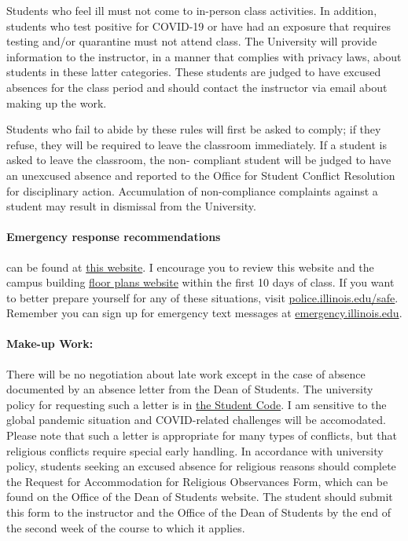 \documentclass[11pt, a4paper]{article}
\begin{document}
                Students who feel ill must not come to in-person class 
                activities. In addition, students who test positive for 
                COVID-19 or have had an exposure that requires testing and/or 
                quarantine must not attend class.  The University will provide 
                information to the instructor, in a manner that complies with 
                privacy laws, about students in these latter categories. These 
                students are judged to have excused absences for the class 
                period and should contact the instructor via email about making 
                up the work.  

                Students who fail to abide by these rules will first be asked 
                to comply; if they refuse, they will be required to leave the 
                classroom immediately. If a student is asked to leave the 
                classroom, the non- compliant student will be judged to have an 
                unexcused absence and reported to the Office for Student 
                Conflict Resolution for disciplinary action. Accumulation of 
                non-compliance complaints against a student may result in 
                dismissal from the University.  

\paragraph{Emergency response recommendations} can be found at 
        \href{http://police.illinois.edu/emergency-preparedness/}{this website}. 
        I encourage you to review this website and the campus building 
        \href{http://police.illinois.edu/emergency-preparedness/building-emergency-action-plans/}{floor 
        plans website} within the first 10 days of class.  If you want to 
        better prepare yourself for any of these situations, visit 
        \url{police.illinois.edu/safe}. Remember you can sign up for emergency 
        text messages at \url{emergency.illinois.edu}.
\paragraph{Make-up Work:} There will be no negotiation about late work 
        except in the case of absence documented by an absence letter from the 
        Dean of Students. The university policy for requesting such a letter 
        is in 
        \href{http://studentcode.illinois.edu/article1_part5_1-501.html}{the 
        Student Code}. I am sensitive to the global pandemic situation and 
        COVID-related challenges will be accomodated. Please note that such a 
        letter is appropriate for many types of conflicts, but that religious 
        conflicts require special early handling. In accordance with university 
        policy, students seeking an excused absence for religious reasons 
        should complete the Request for Accommodation for Religious Observances 
        Form, which can be found on the Office of the Dean of Students website. 
        The student should submit this form to the instructor and the Office of 
        the Dean of Students by the end of the second week of the course to 
        which it applies.
\end{document}
